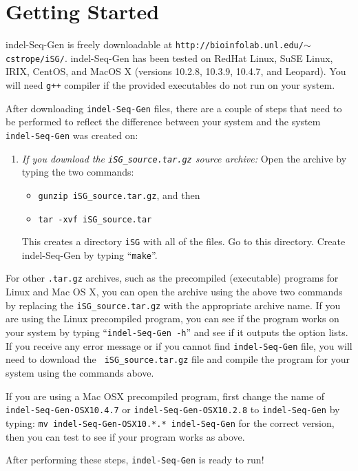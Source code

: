 \documentclass[10pt]{article}
\begin{document}
\section{Getting Started}

indel-Seq-Gen is freely downloadable at {\tt http://bioinfolab.unl.edu/$\sim$cstrope/iSG/}.  
indel-Seq-Gen has been tested on RedHat Linux, SuSE Linux, IRIX, CentOS, and MacOS X (versions 10.2.8, 
10.3.9, 10.4.7, and Leopard).  You will need {\tt g++} compiler if the provided executables do 
not run on your system.

After downloading {\tt indel-Seq-Gen} files, there are a couple of steps that need to be
performed to reflect the difference between your system and the system {\tt indel-Seq-Gen} was
created on:

\begin{enumerate}

\item {\it If you download the {\tt iSG\_source.tar.gz} source archive:}  Open the archive by 
typing the two commands:
 \begin{itemize}
 \item[] {\tt gunzip iSG\_source.tar.gz}, and then
 \item[] {\tt tar -xvf iSG\_source.tar}
 \end{itemize}
This creates a directory {\tt iSG} with all of the files.  Go to this directory. Create
indel-Seq-Gen by typing ``{\tt make}''. 
\end{enumerate}

For other {\tt .tar.gz} archives, such as the precompiled (executable) programs for Linux and
Mac OS X, you can open the archive using the above two commands by
replacing the {\tt iSG\_source.tar.gz} with the appropriate archive name.  If you are using
the Linux precompiled program, you can see if the program works on your system by typing
``{\tt indel-Seq-Gen -h}'' and see if it outputs the option lists.  If you receive any error
message or if you cannot find {\tt indel-Seq-Gen} file, you will need to download the {\tt
iSG\_source.tar.gz} file and compile the program for your system using the commands above.

If you are using a Mac OSX precompiled program, first change the name of {\tt
indel-Seq-Gen-OSX10.4.7} or {\tt indel-Seq-Gen-OSX10.2.8} to {\tt indel-Seq-Gen} by typing:  
\verb+mv indel-Seq-Gen-OSX10.*.* indel-Seq-Gen+ for the correct version, then you can test to see if 
your program works as above.

After performing these steps, {\tt indel-Seq-Gen} is ready to run!
\end{document}
